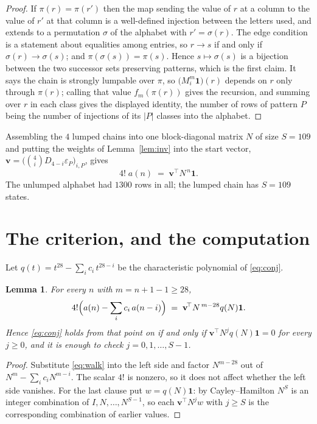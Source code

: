 \documentclass[11pt,a4paper]{article}
\theoremstyle{plain}
\newtheorem{lemma}[theorem]{Lemma}
\theoremstyle{definition}
\begin{document}
\begin{proof}
If $\pi(r)=\pi(r')$ then the map sending the value of $r$ at a column to the value of $r'$
at that column is a well-defined injection between the letters used, and extends to a
permutation $\sigma$ of the alphabet with $r'=\sigma(r)$. The edge condition is a statement
about equalities among entries, so $r\to s$ if and only if $\sigma(r)\to\sigma(s)$; and
$\pi(\sigma(s))=\pi(s)$. Hence $s\mapsto\sigma(s)$ is a bijection between the two successor
sets preserving patterns, which is the first claim. It says the chain is strongly lumpable
over $\pi$, so $\bigl(M_i^{m}\mathbf{1}\bigr)(r)$ depends on $r$ only through $\pi(r)$;
calling that value $f_m(\pi(r))$ gives the recursion, and summing over $r$ in each class
gives the displayed identity, the number of rows of pattern $P$ being the number of
injections of its $|P|$ classes into the alphabet.
\end{proof}

Assembling the $4$ lumped chains into one block-diagonal matrix $N$ of size $S=109$ and
putting the weights of Lemma~\ref{lem:inv} into the start vector,
$\mathbf{v}=\bigl(\binom{4}{i}D_{4-i}\varepsilon_P\bigr)_{i,P}$, gives
\begin{equation}\label{eq:walk}
4!\;a(n)\;=\;\mathbf{v}^{\!\top}N^{\,n}\mathbf{1} .
\end{equation}
The unlumped alphabet had $1300$ rows in all; the lumped chain has $S=109$ states.

\section{The criterion, and the computation}

Let $q(t)=t^{28}-\sum_i c_i\,t^{28-i}$ be the characteristic polynomial of
\eqref{eq:conj}.

\begin{lemma}\label{lem:crit}
For every $n$ with $m=n+1-1\ge28$,
\[
4!\Bigl(a(n)-\sum_i c_i\,a(n-i)\Bigr)\;=\;\mathbf{v}^{\!\top}N^{\,m-28}q(N)\mathbf{1} .
\]
Hence \eqref{eq:conj} holds from that point on if and only if
$\mathbf{v}^{\!\top}N^{j}q(N)\mathbf{1}=0$ for every $j\ge0$, and it is enough to check
$j=0,1,\dots,S-1$.
\end{lemma}

\begin{proof}
Substitute \eqref{eq:walk} into the left side and factor $N^{m-28}$ out of
$N^{m}-\sum_i c_iN^{m-i}$. The scalar $4!$ is nonzero, so it does not affect whether
the left side vanishes. For the last clause put $w=q(N)\mathbf{1}$: by Cayley--Hamilton
$N^{S}$ is an integer combination of $I,N,\dots,N^{S-1}$, so each
$\mathbf{v}^{\!\top}N^{j}w$ with $j\ge S$ is the corresponding combination of earlier
values.
\end{proof}
\end{document}
